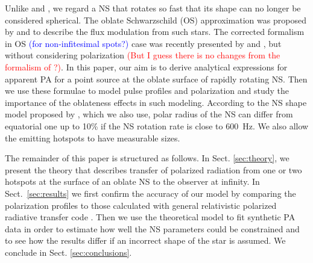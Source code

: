\documentclass{aa}
\newcommand{\red}[1]{\textcolor{red}{#1}}
\newcommand{\blue}[1]{\textcolor{blue}{#1}}
\begin{document}

Unlike \citet{VP04} and \citet{poutanen20}, we regard a NS that rotates so fast that its shape can no longer be considered spherical. 
The oblate Schwarzschild (OS) approximation was proposed by \citet{CMLC07} and \citet{MLC07} to describe the flux modulation from such stars. 
The corrected formalism in OS \blue{(for non-infitesimal spots?)} case was recently presented by \citet{Bogdanov19L26} and \citet{SP20}, but without considering polarization \red{(But I guess there is no changes from the formalism of \citet{SNP18}?)}. 
In this paper, our aim is to derive analytical expressions for apparent PA for a point source at the oblate surface of rapidly rotating NS.
Then we use these formulae to model pulse profiles and polarization and study the importance of the oblateness effects in such modeling.
According to the NS shape model proposed by \citet{AGM14}, which we also use, polar radius of the NS can differ from equatorial one up to 10\% if the NS rotation rate is close to 600~Hz.
We also allow the emitting hotspots to have measurable sizes.




The remainder of this paper is structured as follows. 
In Sect. \ref{sec:theory}, we present the theory that describes transfer of polarized radiation from one or two hotspots at the surface of an oblate NS to the observer at infinity. 
In Sect.~\ref{sec:results} we first confirm the accuracy of our model by comparing the polarization profiles to those calculated with general relativistic polarized radiative transfer code \citep{PMN18}.
Then we use the theoretical model to fit synthetic PA data in order to estimate how well the NS parameters could be constrained and to see how the results differ if an incorrect shape of the star is assumed.
We conclude in Sect. \ref{sec:conclusions}.


\end{document}
